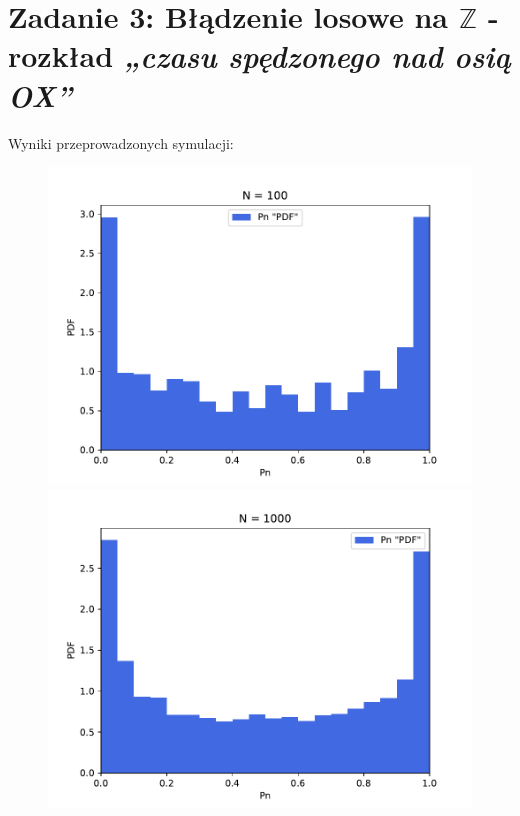\documentclass{article}
\begin{document}
\section*{Zadanie 3: Błądzenie losowe na \(\mathbb{Z}\) - rozkład \textit{„czasu spędzonego nad osią OX”}}

Wyniki przeprowadzonych symulacji:\\
\begin{figure}[h!]
    \centering
    \begin{minipage}{0.45\textwidth}  %
        \centering
        \includegraphics[scale=0.5]{./plots/exc3/n100.pdf}
    \end{minipage}%
    \begin{minipage}{0.45\textwidth}  %
        \centering
        \includegraphics[scale=0.5]{./plots/exc3/n1000.pdf}

\end{minipage}
\end{figure}
\end{document}
